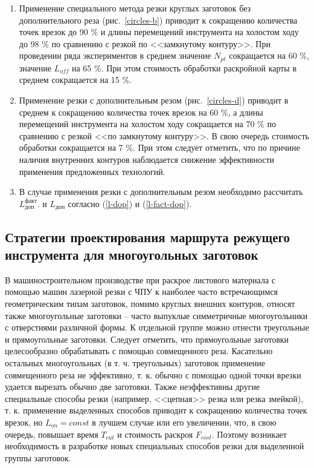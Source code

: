 \documentclass[11pt,twoside,openany]{report}
\begin{document}
\begin{enumerate}
\item
Применение специального метода резки круглых заготовок
без дополнительного реза
(рис.~\ref{circles-b})
приводит к сокращению количества точек врезок до 90 \%
и длины перемещений инструмента на холостом ходу до 98 \%
по сравнению с резкой по <<замкнутому контуру>>.
При проведении ряда экспериментов в среднем значение $N_{pt}$
сокращается на 60 \%, значение $L_{off}$ на 65 \%.
При этом стоимость обработки раскройной карты в среднем сокращается на 15 \%.

\item
Применение резки с дополнительным резом
(рис.~\ref{circles-d})
приводит в среднем к сокращению количества точек врезок на 60 \%,
а длины перемещений инструмента на холостом ходу сокращается на 70 \%
по сравнению с резкой <<по замкнутому контуру>>.
В свою очередь стоимость обработки сокращается на 7 \%.
При этом следует отметить,
что по причине наличия внутренних контуров
наблюдается снижение эффективности применения
предложенных технологий.

\item
В случае применения резки с дополнительным резом необходимо рассчитать
$L_\text{доп}^\text{факт}$.
и
$L_\text{доп}$
согласно (\ref{l-dop}) и (\ref{l-fact-dop}).
\end{enumerate}

\subsection{
  Стратегии проектирования маршрута режущего инструмента
  для многоугольных заготовок
}

В машиностроительном производстве
при раскрое листового материала с помощью машин лазерной резки с ЧПУ
к наиболее часто встречающимся геометрическим
типам заготовок,
помимо круглых внешних контуров,
относят также многоугольные заготовки --
часто выпуклые симметричные многоугольники с отверстиями различной формы.
К отдельной группе можно отнести треугольные и прямоугольные заготовки.
Следует отметить, что прямоугольные заготовки целесообразно обрабатывать
с помощью совмещенного реза.
Касательно остальных многоугольных (в т. ч. треугольных)
заготовок применение совмещенного реза не эффективно,
т. к. обычно с помощью одной точки врезки удается вырезать обычно две заготовки.
Также неэффективны другие специальные способы резки
(например, <<цепная>> резка или резка змейкой),
т. к. применение выделенных способов приводит к
сокращению количества точек врезок,
но
$L_{on}=const$
в лучшем случае или его увеличении,
что,
в свою очередь,
повышает время
$T_{cut}$
и стоимость раскроя
$F_{cost}$.
Поэтому возникает необходимость в разработке
новых специальных способов резки для выделенной группы заготовок.
\end{document}
